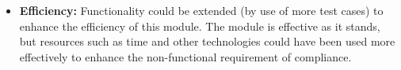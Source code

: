 \documentclass{article}
\begin{document}
    \begin{itemize}
        \item \textbf{Efficiency:}
				Functionality could be extended (by use of more test cases) to enhance
				the efficiency of this module.
				The module is effective as it stands, but resources such as time and
				other technologies could have been used more effectively to enhance the
				non-functional requirement of compliance.
  	\end{itemize}
\end{document}
